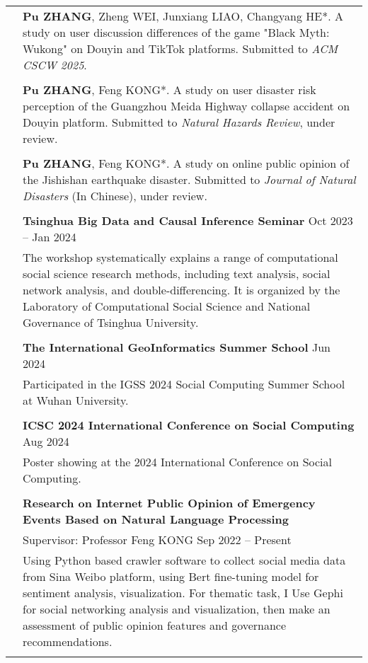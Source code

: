 \documentclass[letterpaper, 11pt]{article}
\begin{document}
\begin{longtable}{p{1.3in}p{4.8in}}
\nohyphens{\color{RoyalBlue}{Working Papers}} 

& \textbf{Pu ZHANG}, Zheng WEI, Junxiang LIAO, Changyang HE*. A study on user discussion differences of the game "Black Myth: Wukong" on Douyin and TikTok platforms. Submitted to \textit{ACM CSCW 2025}.\\
& \\

& \textbf{Pu ZHANG}, Feng KONG*. A study on user disaster risk perception of the Guangzhou Meida Highway collapse accident on Douyin platform. Submitted to \textit{Natural Hazards Review}, under review.\\
& \\

& \textbf{Pu ZHANG}, Feng KONG*. A study on online public opinion of the Jishishan earthquake disaster. Submitted to \textit{Journal of Natural Disasters} (In Chinese), under review.\\
& \\


\color{RoyalBlue}{Workshop}
& \textbf{Tsinghua Big Data and Causal Inference Seminar } \hfill Oct 2023 -- Jan 2024 \\
& The workshop systematically explains a range of computational social science research methods, including text analysis, social network analysis, and double-differencing. It is organized by the Laboratory of Computational Social Science and National Governance of Tsinghua University. \\
& \\
& \textbf{The International GeoInformatics Summer School} \hfill Jun 2024 \\
& Participated in the IGSS 2024 Social Computing Summer School at Wuhan University.\\
& \\
& \textbf{ICSC 2024 International Conference on Social Computing} \hfill Aug 2024 \\
& Poster showing at the 2024 International Conference on Social Computing.\\
& \\


\nohyphens{\color{RoyalBlue}{Research Experience}} 
& \textbf{Research on Internet Public Opinion of Emergency Events Based on Natural Language Processing} \\
& Supervisor: Professor Feng KONG  \hfill Sep 2022 -- Present \\
& Using Python based crawler software to collect social media data from Sina Weibo platform, using Bert fine-tuning model for sentiment analysis, visualization. For thematic task, I Use Gephi for social networking analysis and visualization, then make an assessment of public opinion features and governance recommendations. \\
& \\


\end{longtable}
\end{document}
